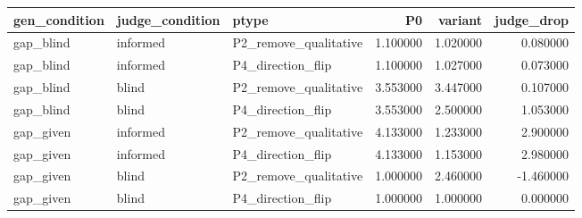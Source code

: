 \begin{tabular}{lllrrr}
\toprule
gen_condition & judge_condition & ptype & P0 & variant & judge_drop \\
\midrule
gap_blind & informed & P2_remove_qualitative & 1.100000 & 1.020000 & 0.080000 \\
gap_blind & informed & P4_direction_flip & 1.100000 & 1.027000 & 0.073000 \\
gap_blind & blind & P2_remove_qualitative & 3.553000 & 3.447000 & 0.107000 \\
gap_blind & blind & P4_direction_flip & 3.553000 & 2.500000 & 1.053000 \\
gap_given & informed & P2_remove_qualitative & 4.133000 & 1.233000 & 2.900000 \\
gap_given & informed & P4_direction_flip & 4.133000 & 1.153000 & 2.980000 \\
gap_given & blind & P2_remove_qualitative & 1.000000 & 2.460000 & -1.460000 \\
gap_given & blind & P4_direction_flip & 1.000000 & 1.000000 & 0.000000 \\
\bottomrule
\end{tabular}
